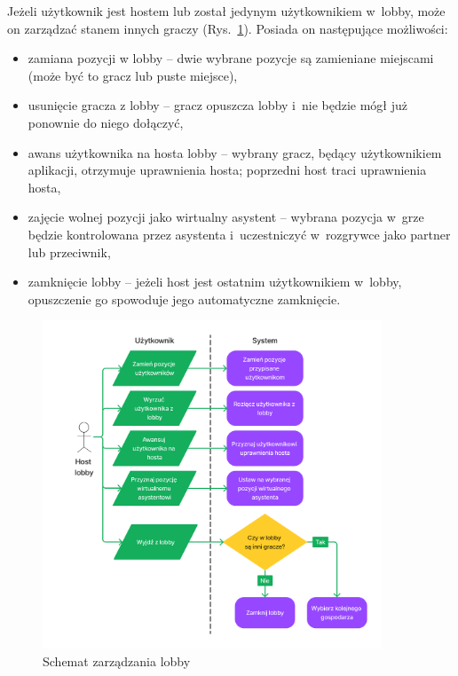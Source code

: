 Jeżeli użytkownik jest hostem lub został jedynym
użytkownikiem w~lobby, może on zarządzać stanem innych graczy (Rys.~\ref{fig:figma_xd_manage_lobby}).
Posiada on następujące możliwości:
\begin{itemize}
  \item zamiana pozycji w lobby -- dwie wybrane pozycje są zamieniane miejscami
        (może być to gracz lub puste miejsce),
  \item usunięcie gracza z lobby -- gracz opuszcza lobby i~nie będzie
        mógł już ponownie do niego dołączyć,
  \item awans użytkownika na hosta lobby -- wybrany gracz, będący użytkownikiem
        aplikacji, otrzymuje uprawnienia hosta; poprzedni host traci uprawnienia hosta,
  \item zajęcie wolnej pozycji jako wirtualny asystent -- wybrana pozycja
        w~grze będzie kontrolowana przez asystenta
        i~uczestniczyć w~rozgrywce jako partner lub przeciwnik,
  \item zamknięcie lobby -- jeżeli host jest ostatnim
        użytkownikiem w~lobby, opuszczenie go spowoduje jego automatyczne
        zamknięcie.

\end{itemize}

\begin{figure}[hbt!]
  \centering
  \includegraphics[width=0.9\textwidth]{img/schematy/manage_lobby.png}
  \caption{Schemat zarządzania lobby}
  \label{fig:figma_xd_manage_lobby}
\end{figure}

